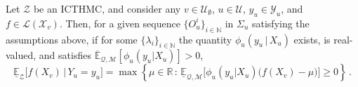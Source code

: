 \documentclass[twoside,11pt]{article}
\newcommand{\nats}{\mathbb{N}}
\newcommand{\reals}{\mathbb{R}}
\newcommand{\states}{\mathcal{X}}
\newcommand{\observs}{\mathcal{Y}}
\newcommand{\lexp}{\underline{\mathbb{E}}_{\rateset,\mathcal{M}}}
\newcommand{\uexp}{\overline{\mathbb{E}}_{\rateset,\mathcal{M}}}
\newcommand{\gambles}{\mathcal{L}}
\newcommand{\rateset}{\mathcal{Q}}
\newcommand{\coloneqq}{:\!=}
\begin{document}
\begin{proposition}\label{prop:GBR_for_densities_lower_zero}
Let $\mathcal{Z}$ be an ICTHMC, and consider any $v\in\mathcal{U}_\emptyset$, $u\in\mathcal{U}$, $y_u\in\observs_u$, and $f\in\gambles(\states_v)$. Then, for a given sequence $\{O_u^i\}_{i\in\nats}$ in $\Sigma_u$ satisfying the assumptions above, if for some $\{\lambda_i\}_{i\in\nats}$ the quantity $\phi_u(y_u\,\vert\,X_u)$ exists, is real-valued, and satisfies $\uexp[\phi_u(y_u\vert X_u)]>0$,
\begin{equation*}
\underline{\mathbb{E}}_{\mathcal{Z}}\bigl[f(X_v)\,\vert\,Y_u = y_u\bigr] = \max\left\{\mu\in\reals\,:\, \lexp\bigl[\phi_u(y_u\vert X_u)\bigl(f(X_v) - \mu\bigr)\bigr] \geq 0\right\}\,.
\end{equation*}
\end{proposition}
%

\end{document}

